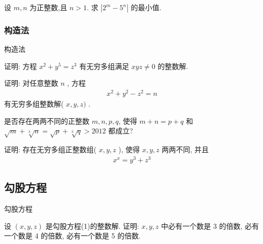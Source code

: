 \documentclass[aspectratio=169]{ctexbeamer}
\theoremstyle{definition}
\begin{document}
\begin{frame}[t]
\begin{example}
	设 $m ,  n$ 为正整数,且 $n>1$. 求 $\left|2^{m}-5^{n}\right|$ 的最小值.
\end{example}
\end{frame}

\subsubsection*{构造法}

\begin{frame}[t]{构造法}
\begin{example}
	证明: 方程 $x^{2}+y^{5}=z^{3}$ 有无穷多组满足 $x y z \neq 0$ 的整数解.
\end{example}
\end{frame}

\begin{frame}[t]
\begin{example}
	证明: 对任意整数 $n$ , 方程
	\begin{align*}
		x^{2}+y^{2}-z^{2}=n
	\end{align*}
	有无穷多组整数解( $x, y, z)$ .
\end{example}
\end{frame}

\begin{frame}[t]
\begin{example}
	是否存在两两不同的正整数 $m ,  n ,  p ,  q$, 使得 $m+n=p+q$ 和 $\sqrt{m}+\sqrt[3]{n}=\sqrt{p}+\sqrt[3]{q}>2012$ 都成立?
\end{example}
\end{frame}


\begin{frame}[t]
\begin{example}
	证明: 存在无穷多组正整数组( $x, y, z$ ), 使得 $x, y, z$ 两两不同, 并且
	\begin{align*}
		x^{x}=y^{3}+z^{3}
	\end{align*}
\end{example}
\end{frame}

\subsection{勾股方程}
\setcounter{theorem}{0}
\begin{frame}[t]{勾股方程}
\begin{example}
	设 $(x, y, z)$ 是勾股方程(1)的整数解. 证明: $x ,  y ,  z$ 中必有一个数是 3 的倍数, 必有一个数是 4 的倍数, 必有一个数是 5 的倍数.
\end{example}
\end{frame}
\end{document}
